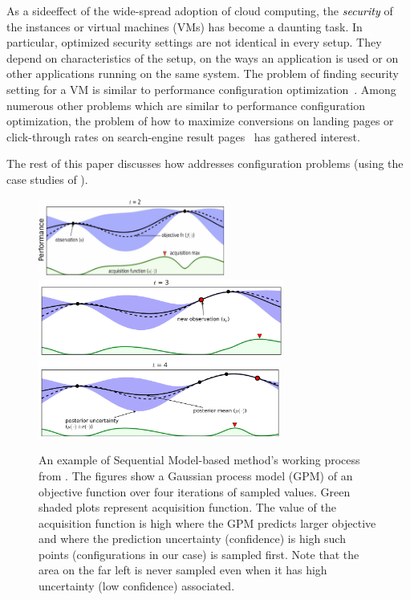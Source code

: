 As a sideeffect of the wide-spread adoption of cloud computing, the \textcolor{black}{{\em security}} of the instances or virtual machines (VMs) has become a daunting task. In particular, optimized security settings are not identical in every setup. They depend on characteristics of the setup, on the ways an application is used or on other applications running on the same system. The problem of finding security setting for a VM is similar to performance configuration optimization~\cite{biedermann2014hot, biedermann2014leveraging, drabik2003method, security1, security2}. 
Among numerous other problems which are similar to performance configuration optimization, the problem of how to maximize conversions on landing pages or click-through rates on search-engine result pages~\cite{hill2017efficient, wang2016beyond, zhu2017optimized} has gathered interest.  


The rest of this paper discusses how \flash addresses configuration problems (using
the case studies of ). 

\begin{figure}[t]
      \includegraphics[width=\linewidth, height=1in]{Chapter-Flash/figures/bayesian_1.png}
    \endminipage\hfill
      \includegraphics[width=\linewidth, height=1in]{Chapter-Flash/figures/bayesian_2.png}
    \endminipage\hfill
      \includegraphics[width=\linewidth, height=1in]{Chapter-Flash/figures/bayesian_3.png}
    \endminipage
\caption[An example of Sequential Model-based method's working process from \cite{brochu2010tutorial}.]{An example of Sequential Model-based method's working process from \cite{brochu2010tutorial}. The figures show a Gaussian process model (GPM) of an objective function over
four iterations of sampled values.
Green shaded plots represent acquisition function. The value of the acquisition function is high where the GPM predicts larger objective and where the prediction uncertainty (confidence) is high such points (configurations in our case) is sampled first. Note that the area on the far left is never sampled even when it has high uncertainty (low confidence) associated.} 
\label{fig:bayesian_optimazation}
\end{figure}

